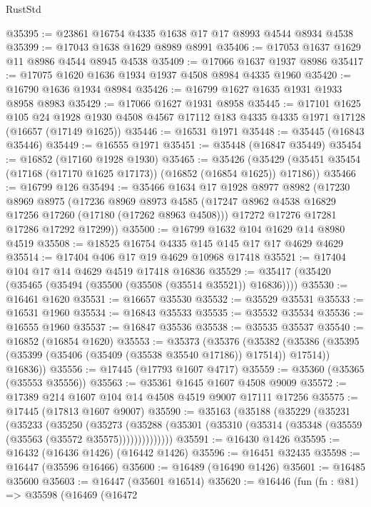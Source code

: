 \begin{lexlean}{RustStd}
\begin{coremodule}
@35395 := @23861 @16754 @4335 @1638 @17 @17 @8993 @4544 @8934 @4538
@35399 := @17043 @1638 @1629 @8989 @8991
@35406 := @17053 @1637 @1629 @11 @8986 @4544 @8945 @4538
@35409 := @17066 @1637 @1937 @8986
@35417 := @17075 @1620 @1636 @1934 @1937 @4508 @8984 @4335 @1960
@35420 := @16790 @1636 @1934 @8984
@35426 := @16799 @1627 @1635 @1931 @1933 @8958 @8983
@35429 := @17066 @1627 @1931 @8958
@35445 := @17101
    @1625
    @105
    @24
    @1928
    @1930
    @4508
    @4567
    @17112
    @183
    @4335
    @4335
    @1971
    @17128
    (@16657 (@17149 @1625))
@35446 := @16531 @1971
@35448 := @35445 (@16843 @35446)
@35449 := @16555 @1971
@35451 := @35448 (@16847 @35449)
@35454 := @16852 (@17160 @1928 @1930)
@35465 := @35426
    (@35429 (@35451 @35454 (@17168 (@17170 @1625 @17173)) (@16852 (@16854 @1625)) @17186))
@35466 := @16799 @126
@35494 := @35466
    @1634
    @17
    @1928
    @8977
    @8982
    (@17230
      @8969
      @8975
      (@17236
        @8969
        @8973
        @4585
        (@17247 @8962 @4538 @16829 @17256 @17260 (@17180 (@17262 @8963 @4508)))
        @17272
        @17276
        @17281
        @17286
        @17292
        @17299))
@35500 := @16799 @1632 @104 @1629 @14 @8980 @4519
@35508 := @18525 @16754 @4335 @145 @145 @17 @17 @4629 @4629
@35514 := @17404 @406 @17 @19 @4629 @10968 @17418
@35521 := @17404 @104 @17 @14 @4629 @4519 @17418 @16836
@35529 := @35417 (@35420 (@35465 (@35494 (@35500 (@35508 (@35514 @35521)) @16836))))
@35530 := @16461 @1620
@35531 := @16657 @35530
@35532 := @35529 @35531
@35533 := @16531 @1960
@35534 := @16843 @35533
@35535 := @35532 @35534
@35536 := @16555 @1960
@35537 := @16847 @35536
@35538 := @35535 @35537
@35540 := @16852 (@16854 @1620)
@35553 := @35373
    (@35376
      (@35382
        (@35386 (@35395 (@35399 (@35406 (@35409 (@35538 @35540 @17186)) @17514)) @17514))
        @16836))
@35556 := @17445 (@17793 @1607 @4717)
@35559 := @35360 (@35365 (@35553 @35556))
@35563 := @35361 @1645 @1607 @4508 @9009
@35572 := @17389 @214 @1607 @104 @14 @4508 @4519 @9007 @17111 @17256
@35575 := @17445 (@17813 @1607 @9007)
@35590 := @35163
    (@35188
      (@35229
        (@35231
          (@35233
            (@35250
              (@35273
                (@35288 (@35301 (@35310 (@35314 (@35348 (@35559 (@35563 (@35572 @35575))))))))))))))
@35591 := @16430 @1426
@35595 := @16432 (@16436 @1426) (@16442 @1426)
@35596 := @16451 @32435
@35598 := @16447 (@35596 @16466)
@35600 := @16489 (@16490 @1426)
@35601 := @16485 @35600
@35603 := @16447 (@35601 @16514)
@35620 := @16446
    (fun (fn : @81) =>
    @35598
      (@16469
        (@16472

\end{coremodule}
\end{lexlean}
